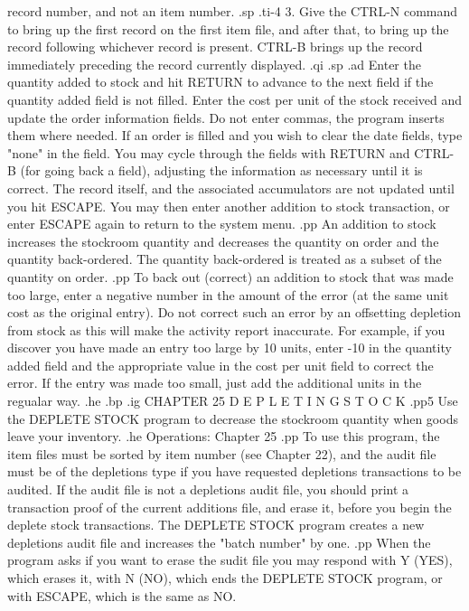 record number, and not an item number.
.sp
.ti-4
3.  Give the CTRL-N command to bring up the first record on the first
item file, and after that, to bring up the record following whichever
record is present. CTRL-B brings up the record immediately preceding
the record currently displayed.
.qi
.sp
.ad
Enter the quantity added to stock and hit RETURN to advance to the next
field if the quantity added field is not filled.  Enter the cost per unit
of the stock received and update the order information fields.	Do not enter
commas, the program inserts them where needed. If an order
is filled and you wish to clear the date fields, type "none" in the field.
You may cycle through the fields with RETURN and CTRL-B (for going back
a field), adjusting the information as necessary until it is correct.
The record itself, and the associated accumulators are not updated until
you hit ESCAPE.  You may then enter another addition to stock transaction,
or enter ESCAPE again to return to the system menu.
.pp
An addition to stock increases the stockroom quantity and decreases the
quantity on order and the quantity back-ordered.  The quantity back-ordered
is treated as a subset of the quantity on order.
.pp
To back out (correct) an addition to stock that was made too large,
enter a negative
number in the amount of the error (at the same unit cost as the original
entry).  Do not correct such an error by an offsetting depletion from stock as
this will make the activity report inaccurate.	For example, if you discover
you have made an entry too large by 10 units, enter -10 in the quantity
added field and the appropriate value in the cost per unit field
to correct the error.  If the entry was made too small, just add the
additional units in the regualar way.
.he
.bp
.ig
CHAPTER 25
D E P L E T I N G    S T O C K
.pp5
Use the DEPLETE STOCK program to decrease the stockroom quantity
when goods leave your inventory.
.he Operations: Chapter 25
.pp
To use this program, the item files must be sorted by item number
(see Chapter 22), and the audit file must be of the depletions type
if you have requested depletions transactions to be audited.  If
the audit file is not a depletions audit file, you should print
a transaction proof of the current additions file, and erase it, before
you begin the deplete stock transactions.  The DEPLETE STOCK program
creates a new depletions audit file and increases the "batch number"
by one.
.pp
When the program asks if you want to erase the sudit file you may respond
with Y (YES), which erases it, with N (NO), which ends the DEPLETE STOCK
program, or with ESCAPE, which is the same as NO.
